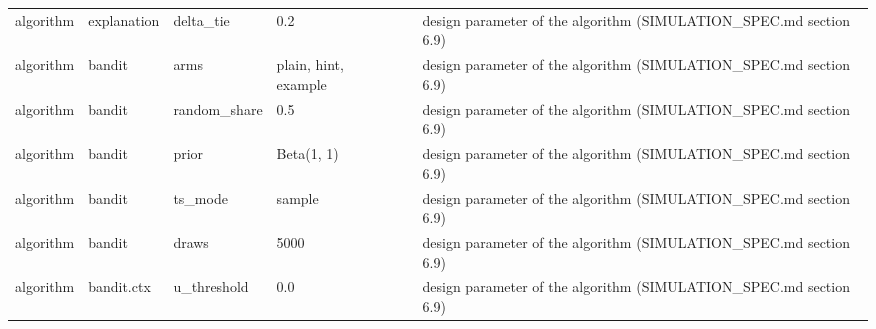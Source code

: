 \begin{table}[H]
\begin{tabular}{llllll}
algorithm & explanation & delta\_tie & 0.2 &  & design parameter of the algorithm (SIMULATION\_SPEC.md section 6.9) \\
algorithm & bandit & arms & plain, hint, example &  & design parameter of the algorithm (SIMULATION\_SPEC.md section 6.9) \\
algorithm & bandit & random\_share & 0.5 &  & design parameter of the algorithm (SIMULATION\_SPEC.md section 6.9) \\
algorithm & bandit & prior & Beta(1, 1) &  & design parameter of the algorithm (SIMULATION\_SPEC.md section 6.9) \\
algorithm & bandit & ts\_mode & sample &  & design parameter of the algorithm (SIMULATION\_SPEC.md section 6.9) \\
algorithm & bandit & draws & 5000 &  & design parameter of the algorithm (SIMULATION\_SPEC.md section 6.9) \\
algorithm & bandit.ctx & u\_threshold & 0.0 &  & design parameter of the algorithm (SIMULATION\_SPEC.md section 6.9) \\
\bottomrule
\end{tabular}
\end{table}
